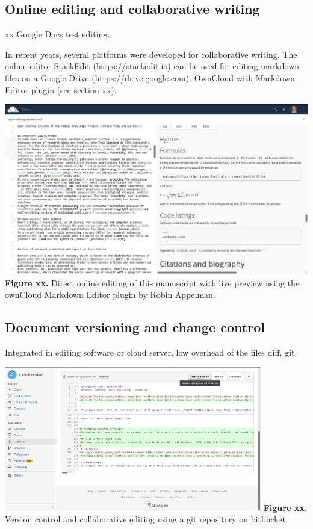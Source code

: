 \documentclass[10pt,fleqn]{wlpeerj}
\begin{document}
\subsection{Online
editing
and
collaborative
writing}\label{online-editing-and-collaborative-writing}

xx
Google
Docs
test
editing.

In
recent
years,
several
platforms
were
developed
for
collaborative
writing.
The
online
editor
StackEdit
(\url{https://stackedit.io})
can
be
used
for
editing
markdown
files
on a
Google
Drive
(\url{https://drive.google.com}).
OwnCloud
with
Markdown
Editor
plugin
(see
section
xx).

\includegraphics{fig-owncloud-md-editor.png}
\textbf{Figure
xx.}
Direct
online
editing
of
this
manuscript
with
live
preview
using
the
ownCloud
Markdown
Editor
plugin
by
Robin
Appelman.

\subsection{Document
versioning
and
change
control}\label{document-versioning-and-change-control}

Integrated
in
editing
software
or
cloud
server,
low
overhead
of
the
files
diff,
git.

\includegraphics{fig-bitbucket-diff.png}
\textbf{Figure
xx.}
Version
control
and
collaborative
editing
using
a git
repository
on
bitbucket.
\end{document}
